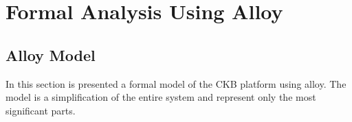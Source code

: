 \chapter{Formal Analysis Using Alloy}

\section{Alloy Model}
In this section is presented a formal model of the CKB platform using alloy. The model is a simplification of the entire system and represent only the most significant parts.
